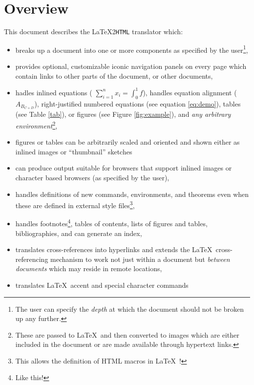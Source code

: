\documentclass[dvips]{article}
\newcommand{\latextohtml}{\LaTeX 2\texttt{HTML}}
\begin{document}
\pagebreak
\tableofcontents
\listoffigures
\listoftables

\pagebreak

\section{Overview}
This document describes the \latextohtml{} translator which:

\begin{itemize}
\item breaks up a document into one or more components as specified
by the user\footnote{The user can specify the \emph{depth} at which 
the document should not be broken up any further.},
\item provides optional, customizable iconic navigation
panels on every page which contain links to other parts of the
document, or other documents,
\item hadles inlined equations ( \(\sum_{i=1}^{n} x_{i} =
\int_{0}^{1} f \)), handles equation alignment ($A_{B_{C+D}}$), 
right-justified numbered equations
(see equation \ref{eq:demo}), tables (see Table \ref{tab}), or
figures (see Figure \ref{fig:example}),
and \emph{any arbitrary environment}\footnote{These are
passed to \LaTeX\  and then converted to images which are either included
in the document or are made available through hypertext links.},
\item 
\begin{changebar}
figures or tables can be arbitrarily scaled 
and oriented and shown either as inlined images or ``thumbnail'' sketches
\end{changebar}
\item can produce output suitable for browsers that support inlined
images or character based browsers (as specified by the user),
\item handles definitions of new commands, environments, and theorems
even when these are defined in external style files\footnote{
This allows the definition of HTML macros in \LaTeX\   !},
\item handles footnotes\footnote{Like this!}, tables of contents, lists
of figures and tables, bibliographies, and can generate an
 index,
\item translates cross-references into hyperlinks and 
extends the \LaTeX\  cross-referencing mechanism to work
not just within a document but \emph{between documents} which may
reside in remote locations, 
\item translates \LaTeX\  accent and special character commands

\end{itemize}
\end{document}
